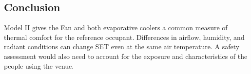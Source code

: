 \subsection{Conclusion}

Model II gives the Fan and both evaporative coolers a common measure of thermal comfort for the reference occupant. Differences in airflow, humidity, and radiant conditions can change SET even at the same air temperature. A safety assessment would also need to account for the exposure and characteristics of the people using the venue.
